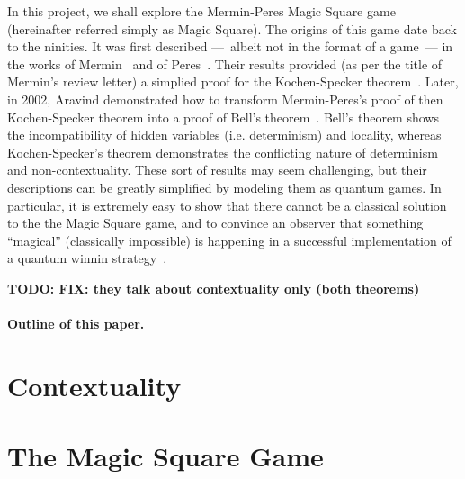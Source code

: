 \documentclass{llncs}
\newcommand{\todo}[1]{{\color{red}\bfseries{}TODO: #1}}
\begin{document}
In this project, we shall explore the Mermin-Peres Magic Square game
(hereinafter referred simply as Magic Square). The origins of this
game date back to the ninities. It was first described ---~albeit not
in the format of a game~--- in the works of Mermin~\cite{mermin:1990}
and of Peres~\cite{peres:1990}. Their results provided (as per the
title of Mermin's review letter) a simplied proof for the
Kochen-Specker theorem~\cite{Kocher1975}. Later, in 2002, Aravind
demonstrated how to transform Mermin-Peres's proof of then
Kochen-Specker theorem into a proof of Bell's
theorem~\cite{aravind:xxx}. Bell's theorem shows the incompatibility
of hidden variables (i.e. determinism) and locality, whereas
Kochen-Specker's theorem demonstrates the conflicting nature of
determinism and non-contextuality.  These sort of results may seem
challenging, but their descriptions can be greatly simplified by
modeling them as quantum games.  In particular, it is extremely easy
to show that there cannot be a classical solution to the the Magic
Square game, and to convince an observer that something ``magical''
(classically impossible) is happening in a successful implementation
of a quantum winnin strategy~\cite{brassard:2005}.

\todo{FIX: they talk about contextuality only (both theorems)}

\paragraph{Outline of this paper.}
\section{Contextuality}
\label{sec:local-context}


\section{The Magic Square Game}
\label{sec:magic-square}
\end{document}
